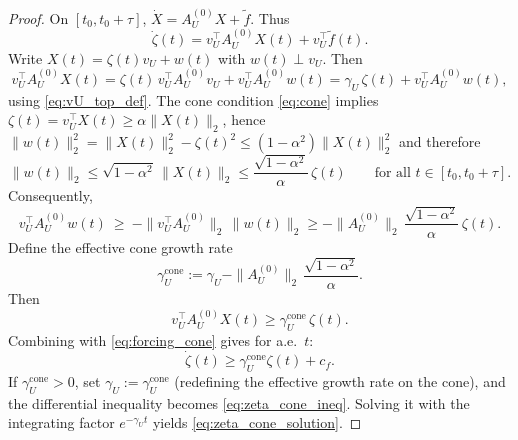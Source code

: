 \documentclass[10pt,a4paper]{amsart}
\begin{document}
\begin{proof}
	On $[t_0,t_0+\tau]$, $\dot X=A_U^{(0)}X+\widetilde f$. Thus
	\[
	\dot\zeta(t)=v_U^\top A_U^{(0)}X(t)+v_U^\top\widetilde f(t).
	\]
	Write $X(t)=\zeta(t)v_U+w(t)$ with $w(t)\perp v_U$. Then
	\[
	v_U^\top A_U^{(0)}X(t)
	=\zeta(t)\,v_U^\top A_U^{(0)}v_U + v_U^\top A_U^{(0)}w(t)
	=\gamma_U\,\zeta(t) + v_U^\top A_U^{(0)}w(t),
	\]
	using \eqref{eq:vU_top_def}. The cone condition \eqref{eq:cone} implies
	$\zeta(t)=v_U^\top X(t)\ge \alpha\|X(t)\|_2$, hence $\|w(t)\|_2^2=\|X(t)\|_2^2-\zeta(t)^2\le (1-\alpha^2)\|X(t)\|_2^2$ and therefore
	\begin{equation}\label{eq:w_bound}
		\|w(t)\|_2 \le \sqrt{1-\alpha^2}\,\|X(t)\|_2 \le \frac{\sqrt{1-\alpha^2}}{\alpha}\,\zeta(t)
		\qquad \text{for all } t\in[t_0,t_0+\tau].
	\end{equation}
	Consequently,
	\[
	v_U^\top A_U^{(0)}w(t)\ \ge\ -\|v_U^\top A_U^{(0)}\|_2\,\|w(t)\|_2
	\ge
	-\|A_U^{(0)}\|_2\,\frac{\sqrt{1-\alpha^2}}{\alpha}\,\zeta(t).
	\]
	Define the effective cone growth rate
	\begin{equation}\label{eq:gammaU_eff}
		\gamma_U^{\mathrm{cone}}
		:=
		\gamma_U - \|A_U^{(0)}\|_2\,\frac{\sqrt{1-\alpha^2}}{\alpha}.
	\end{equation}
	Then
	\[
	v_U^\top A_U^{(0)}X(t)
	\ge
	\gamma_U^{\mathrm{cone}}\,\zeta(t).
	\]
	Combining with \eqref{eq:forcing_cone} gives for a.e.\ $t$:
	\[
	\dot\zeta(t)\ge \gamma_U^{\mathrm{cone}}\zeta(t)+c_f.
	\]
	If $\gamma_U^{\mathrm{cone}}>0$, set $\gamma_U:=\gamma_U^{\mathrm{cone}}$ (redefining the effective growth rate on the cone),
	and the differential inequality becomes \eqref{eq:zeta_cone_ineq}. Solving it with the integrating factor
	$e^{-\gamma_U t}$ yields \eqref{eq:zeta_cone_solution}.
\end{proof}
\end{document}
